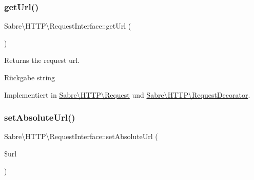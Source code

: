 \mbox{\label{interface_sabre_1_1_h_t_t_p_1_1_request_interface_a0b28a29e4efe43665cc2f23fbac62570}} 
\subsubsection{\texorpdfstring{get\+Url()}{getUrl()}}
{\footnotesize\ttfamily Sabre\textbackslash{}\+H\+T\+T\+P\textbackslash{}\+Request\+Interface\+::get\+Url (\begin{DoxyParamCaption}{ }\end{DoxyParamCaption})}

Returns the request url.

\begin{DoxyReturn}{Rückgabe}
string 
\end{DoxyReturn}


Implementiert in \mbox{\hyperlink{class_sabre_1_1_h_t_t_p_1_1_request_a197522746cac4ff79480d292b8664f88}{Sabre\textbackslash{}\+H\+T\+T\+P\textbackslash{}\+Request}} und \mbox{\hyperlink{class_sabre_1_1_h_t_t_p_1_1_request_decorator_a7d8a661f5bc1d045b4d1d9d315ff6aae}{Sabre\textbackslash{}\+H\+T\+T\+P\textbackslash{}\+Request\+Decorator}}.

\mbox{\label{interface_sabre_1_1_h_t_t_p_1_1_request_interface_a83a1eb456bef5552d0cbaae761f91ac1}} 
\subsubsection{\texorpdfstring{set\+Absolute\+Url()}{setAbsoluteUrl()}}
{\footnotesize\ttfamily Sabre\textbackslash{}\+H\+T\+T\+P\textbackslash{}\+Request\+Interface\+::set\+Absolute\+Url (\begin{DoxyParamCaption}\item[{}]{\$url }\end{DoxyParamCaption})}

